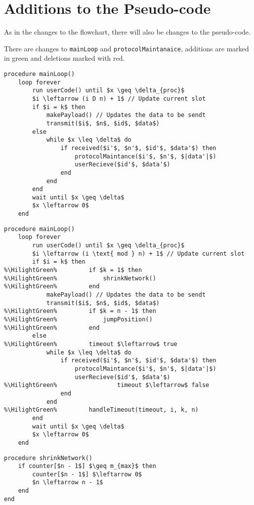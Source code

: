\section{Additions to the Pseudo-code}
As in the changes to the flowchart, there will also be changes to the pseudo-code. 

There are changes to \texttt{mainLoop} and \texttt{protocolMaintanaice}, additions are marked in green and deletions marked with red.


\begin{lstlisting}[style=pseudocode,mathescape=true,float,floatplacement=H, label={lst:general_case1}, caption={Pseudocode example of the main loop}] 
procedure mainLoop()
	loop forever
		run userCode() until $x \geq \delta_{proc}$
		$i \leftarrow (i D n) + 1$ // Update current slot
		if $i = k$ then
			makePayload() // Updates the data to be sendt
			transmit($i$, $n$, $id$, $data$)
		else
			while $x \leq \delta$ do
				if received($i'$, $n'$, $id'$, $data'$) then
					protocolMaintance($i'$, $n'$, $|data'|$)
					userRecieve($id'$, $data'$)
				end
			end
		end
		wait until $x \geq \delta$
		$x \leftarrow 0$ 
	end
\end{lstlisting}  


\begin{lstlisting}[style=pseudocode,mathescape=true,float, label={lst:general_case2}, caption={Modifications to the previous pseudocode are highlighted in green.}, escapechar=\%] 
procedure mainLoop()
	loop forever
		run userCode() until $x \geq \delta_{proc}$
		$i \leftarrow (i \text{ mod } n) + 1$ // Update current slot
		if $i = k$ then
%\HilightGreen%			if $k = 1$ then
%\HilightGreen%				shrinkNetwork()
%\HilightGreen%			end
			makePayload() // Updates the data to be sendt
			transmit($i$, $n$, $id$, $data$)
%\HilightGreen%			if $k = n - 1$ then
%\HilightGreen%				jumpPosition()
%\HilightGreen%			end
		else
%\HilightGreen%			timeout $\leftarrow$ true
			while $x \leq \delta$ do
				if received($i'$, $n'$, $id'$, $data'$) then
					protocolMaintance($i'$, $n'$, $|data'|$)
					userRecieve($id'$, $data'$)
%\HilightGreen%					timeout $\leftarrow$ false
				end
			end
%\HilightGreen%			handleTimeout(timeout, i, k, n)
		end
		wait until $x \geq \delta$
		$x \leftarrow 0$ 
	end
\end{lstlisting} 

\begin{lstlisting}[style=pseudocode,mathescape=true,float, label={lst:general_case5}, caption={Pseudocode example of the main loop}] 
procedure shrinkNetwork()
	if counter[$n - 1$] $\geq m_{max}$ then
		counter[$n - 1$] $\leftarrow 0$
		$n \leftarrow n - 1$
	end
end
\end{lstlisting}

